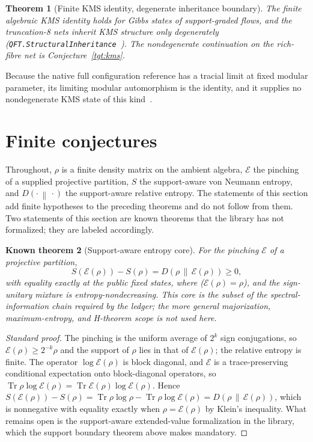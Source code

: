 \documentclass[11pt]{article}
\newtheorem{theorem}{Theorem}[section]
\newtheorem{known}[theorem]{Known theorem}
\theoremstyle{remark}
\newcommand{\KL}[2]{D\!\left(#1\,\middle\|\,#2\right)}
\newcommand{\Ent}{S}
\begin{document}
\begin{theorem}[Finite KMS identity, degenerate inheritance boundary]
The finite algebraic KMS identity holds for Gibbs states of
support-graded flows, and the truncation-8 nets inherit KMS
structure only degenerately
(\texttt{QFT.StructuralInheritance}~\cite{ophlean}).
The nondegenerate continuation on the rich-fibre net is
Conjecture~\ref{tgt:kms}.
\end{theorem}

Because the native full configuration reference has a tracial limit at
fixed modular parameter, its limiting modular automorphism is the identity,
and it supplies no nondegenerate KMS state of this
kind~\cite{ophtimefields}.

\section{Finite conjectures}
\label{sec:targets}

Throughout, $\rho$ is a finite density matrix on the ambient algebra,
$\mathcal E$ the pinching of a supplied projective partition, $\Ent$ the
support-aware von Neumann entropy, and $\KL{\cdot}{\cdot}$ the
support-aware relative entropy. The statements of this section add finite
hypotheses to the preceding theorems and do not follow from them. Two statements of this section are known theorems that the
library has not formalized; they are labeled accordingly.

\begin{known}[Support-aware entropy core]
\label{tgt:core}
For the pinching $\mathcal E$ of a projective partition,
\[
  \Ent(\mathcal E(\rho))-\Ent(\rho)=\KL{\rho}{\mathcal E(\rho)}\ge 0 ,
\]
with equality exactly at the public fixed states, where
($\mathcal E(\rho)=\rho$), and the sign-unitary mixture is
entropy-nondecreasing. This core is the subset of the
spectral-information chain required by the ledger; the more general
majorization, maximum-entropy, and H-theorem scope is not used here.
\end{known}

\begin{proof}[Standard proof]
The pinching is the uniform average of $2^k$ sign conjugations, so
$\mathcal E(\rho)\ge2^{-k}\rho$ and the support of $\rho$ lies in that of
$\mathcal E(\rho)$; the relative entropy is finite. The operator
$\log\mathcal E(\rho)$ is block diagonal, and $\mathcal E$ is a
trace-preserving conditional expectation onto block-diagonal operators, so
$\operatorname{Tr}\rho\log\mathcal E(\rho)=\operatorname{Tr}\mathcal E(\rho)
\log\mathcal E(\rho)$. Hence
$\Ent(\mathcal E(\rho))-\Ent(\rho)=\operatorname{Tr}\rho\log\rho
-\operatorname{Tr}\rho\log\mathcal E(\rho)=\KL{\rho}{\mathcal E(\rho)}$,
which is nonnegative with equality exactly when $\rho=\mathcal E(\rho)$ by
Klein's inequality. What remains open is the support-aware extended-value
formalization in the library, which the support boundary theorem above makes
mandatory.
\end{proof}
\end{document}
